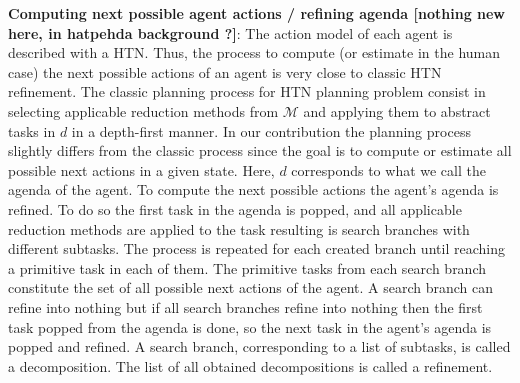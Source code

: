 \documentclass[letterpaper]{article} %
\begin{document}
\textbf{Computing next possible agent actions / refining agenda [nothing new here, in hatpehda background ?]}:
The action model of each agent is described with a HTN. Thus, the process to compute (or estimate in the human case) the next possible actions of an agent is very close to classic HTN refinement.
The classic planning process for HTN planning problem consist in selecting applicable reduction methods from $\mathcal{M}$ and applying them to abstract tasks in $d$ in a depth-first manner. In our contribution the planning process slightly differs from the classic process since the goal is to compute or estimate all possible next actions in a given state. 
Here, $d$ corresponds to what we call the agenda of the agent. To compute the next possible actions the agent's agenda is refined. To do so the first task in the agenda is popped, and all applicable reduction methods are applied to the task resulting is search branches with different subtasks. The process is repeated for each created branch until reaching a primitive task in each of them. The primitive tasks from each search branch constitute the set of all possible next actions of the agent.
A search branch can refine into nothing but if all search branches refine into nothing then the first task popped from the agenda is done, so the next task in the agent's agenda is popped and refined. 
A search branch, corresponding to a list of subtasks, is called a decomposition. The list of all obtained decompositions is called a refinement.  





\end{document}
